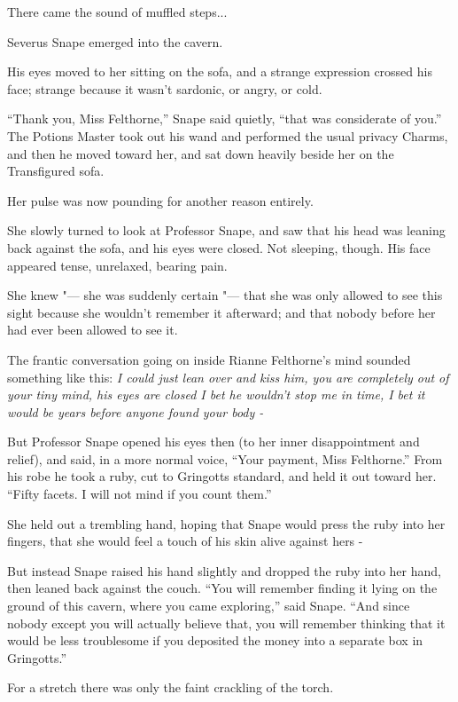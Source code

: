 There came the sound of muffled steps...

Severus Snape emerged into the cavern.

His eyes moved to her sitting on the sofa, and a strange expression
crossed his face; strange because it wasn't sardonic, or angry, or cold.

``Thank you, Miss Felthorne,'' Snape said quietly, ``that was
considerate of you.'' The Potions Master took out his wand and performed
the usual privacy Charms, and then he moved toward her, and sat down
heavily beside her on the Transfigured sofa.

Her pulse was now pounding for another reason entirely.

She slowly turned to look at Professor Snape, and saw that his head was
leaning back against the sofa, and his eyes were closed. Not sleeping,
though. His face appeared tense, unrelaxed, bearing pain.

She knew "--- she was suddenly certain "--- that she was only allowed to see
this sight because she wouldn't remember it afterward; and that nobody
before her had ever been allowed to see it.

The frantic conversation going on inside Rianne Felthorne's mind sounded
something like this: \emph{I could just lean over and kiss him, you are
completely out of your tiny mind, his eyes are closed I bet he wouldn't
stop me in time, I bet it would be years before anyone found your body
-}

But Professor Snape opened his eyes then (to her inner disappointment
and relief), and said, in a more normal voice, ``Your payment, Miss
Felthorne.'' From his robe he took a ruby, cut to Gringotts standard,
and held it out toward her. ``Fifty facets. I will not mind if you count
them.''

She held out a trembling hand, hoping that Snape would press the ruby
into her fingers, that she would feel a touch of his skin alive against
hers -

But instead Snape raised his hand slightly and dropped the ruby into her
hand, then leaned back against the couch. ``You will remember finding it
lying on the ground of this cavern, where you came exploring,'' said
Snape. ``And since nobody except you will actually believe that, you
will remember thinking that it would be less troublesome if you
deposited the money into a separate box in Gringotts.''

For a stretch there was only the faint crackling of the torch.

